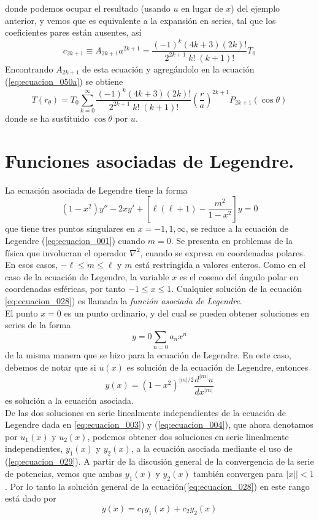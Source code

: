 donde podemos ocupar el resultado (usando $u$ en lugar de $x$) del ejemplo anterior, y vemos que es equivalente a la expansión en series, tal que los coeficientes pares están ausentes, así
\[ c_{2k+1} \equiv A_{2k+1} a^{2k+1} = \dfrac{(-1)^{k}(4k+3)(2k)!}{2^{2k+1} \; k! \; (k+1)!} T_{0} \]
Encontrando $A_{2k+1}$ de esta ecuación y agregándolo en la ecuación (\ref{eq:ecuacion_050a}) se obtiene
\begin{equation}
T(r_\theta) = T_{0} \sum_{k=0}^{\infty} \dfrac{(-1)^{k}(4k+3)(2k)!}{2^{2k+1} \; k! \; (k+1)!} \left( \dfrac{r}{a} \right)^{2k+1} P_{2k+1} (\cos \theta)
\label{eq:ecuacion_052a}
\end{equation}
donde se ha sustituido $\cos \theta$ por $u$.
\section{Funciones asociadas de Legendre.}
La ecuación asociada de Legendre tiene la forma
\begin{equation}
(1 - x^{2}) y'' - 2 x y' + \left[ \ell (\ell + 1) - \dfrac{m^{2}}{1 - x^{2}} \right] y = 0
\label{eq:ecuacion_028}
\end{equation}
que tiene tres puntos singulares en $x = -1, 1, \infty$, se reduce a la ecuación de Legendre (\ref{eq:ecuacion_001}) cuando $m=0$. Se presenta en problemas de la física que involucran el operador $\nabla^{2}$, cuando se expresa en coordenadas polares. En esos casos, $- \ell \leq m \leq \ell$ y $m$ está restringida a valores enteros. Como en el caso de la ecuación de Legendre, la variable $x$ es el coseno del ángulo polar en coordenadas esféricas, por tanto $-1 \leq x \leq 1$. Cualquier solución de la ecuación \ref{eq:ecuacion_028}) es llamada la \emph{función asociada de Legendre}.
\\
El punto $x=0$ es un punto ordinario, y del cual se pueden obtener soluciones en series de la forma
\[ y = 0\sum_{n=0} a_{n} x^{n} \]
de la misma manera que se hizo para la ecuación de Legendre. En este caso, debemos de notar que si $u(x)$ es solución de la ecuación de Legendre, entonces
\begin{equation}
y(x) = (1 -x^{2})^{\vert m \vert / 2} \dfrac{d^{\vert m \vert} u}{d x^{\vert m \vert}}
\label{eq:ecuacion_029}
\end{equation}
es solución a la ecuación asociada.
\\
De las dos soluciones en serie linealmente independientes de la ecuación de Legendre dada en \ref{eq:ecuacion_003}) y (\ref{eq:ecuacion_004}), que ahora denotamos por $u_{1} (x)$ y $u_{2}(x)$, podemos obtener dos soluciones en serie linealmente independientes, $y_{1} (x)$ y $y_{2} (x)$, a la ecuación asociada mediante el uso de (\ref{eq:ecuacion_029}). A partir de la discusión general de la convergencia de la serie de potencias, vemos que ambas $y_{1} (x)$ y $y_{2} (x)$ también convergen para $\vert x |\vert < 1$. Por lo tanto la solución general de la ecuación(\ref{eq:ecuacion_028}) en este rango está dado por
\[ y(x) = c_{1} y_{1} (x) + c_{2} y_{2} (x) \]
